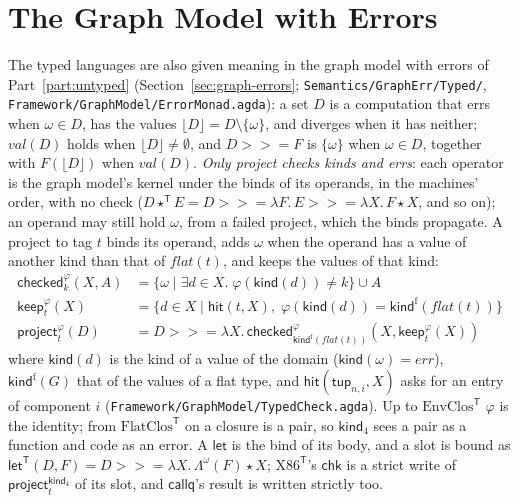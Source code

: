 \documentclass[10pt]{article}
\theoremstyle{acmplain}
\newcommand{\key}[1]{\mathsf{#1}}
\newcommand{\app}{\star}
\newcommand{\NE}{\neq\emptyset}
\newcommand{\bind}{\mathbin{>\!\!>\!\!=}}
\newcommand{\Tl}[1]{\textrm{#1}^{\mathsf{T}}}  %
\newcommand{\Tttup}[2]{\key{tup}_{#1,#2}}      %
\newcommand{\Tflatof}[1]{\mathit{flat}(#1)}    %
\newcommand{\Tchecked}[1]{\key{checked}^{#1}}             %
\newcommand{\Tkind}{\key{kind}}
\newcommand{\Tkindf}{\key{kind}^{\mathrm{f}}}             %
\newcommand{\Tkindfour}{\key{kind}_4}
\newcommand{\Tkeep}[1]{\key{keep}^{#1}}
\newcommand{\Thit}{\key{hit}}
\newcommand{\Tletv}{\key{let}^{\mathsf{T}}}               %
\begin{document}
\section{The Graph Model with Errors}\label{sec:t-gerr}

The typed languages are also given meaning in the graph model with errors
of Part~\ref{part:untyped} (Section~\ref{sec:graph-errors};
\texttt{Semantics/GraphErr/Typed/}, \texttt{Framework/GraphModel/ErrorMonad.agda}):
a set $D$ is a computation that errs when $\omega \in D$, has the values
$\lfloor D \rfloor = D \setminus \{\omega\}$, and diverges when it has
neither; $\mathit{val}(D)$ holds when $\lfloor D \rfloor \NE$, and $D \bind F$
is $\{\omega\}$ when $\omega \in D$, together with $F(\lfloor D \rfloor)$ when
$\mathit{val}(D)$. \emph{Only project checks kinds and errs}: each operator
is the graph model's kernel under the binds of its operands, in the
machines' order, with no check ($D \app^{\mathsf{T}} E = D \bind \lambda F.\,
E \bind \lambda X.\, F \app X$, and so on); an operand may still hold
$\omega$, from a failed project, which the binds propagate. A project to tag
$t$ binds its operand, adds $\omega$ when the operand has a value of another
kind than that of $\Tflatof{t}$, and keeps the values of that kind:
\begin{align*}
  \Tchecked{\varphi}_k(X, A) &= \{ \omega \mid \exists d \in X.\; \varphi(\Tkind(d)) \neq k \} \cup A \\
  \Tkeep{\varphi}_t(X) &= \{ d \in X \mid \Thit(t, X),\; \varphi(\Tkind(d)) = \Tkindf(\Tflatof{t}) \} \\
  \key{project}^{\varphi}_t(D) &= D \bind \lambda X.\, \Tchecked{\varphi}_{\Tkindf(\Tflatof{t})}(X, \Tkeep{\varphi}_t(X))
\end{align*}
where $\Tkind(d)$ is the kind of a value of the domain ($\Tkind(\omega) =
\mathit{err}$), $\Tkindf(G)$ that of the values of a flat type, and
$\Thit(\Tttup{n}{i}, X)$ asks for an entry of component $i$
(\texttt{Framework/GraphModel/TypedCheck.agda}). Up to $\Tl{EnvClos}$ $\varphi$
is the identity; from $\Tl{FlatClos}$ on a closure is a pair, so $\Tkindfour$
sees a pair as a function and code as an error. A $\key{let}$ is the bind
of its body, and a slot is bound as $\Tletv(D, F) = D \bind \lambda X.\,
\Lambda^{\omega}(F) \app X$; $\Tl{X86}$'s $\key{chk}$ is a strict write of
$\key{project}^{\Tkindfour}_t$ of its slot, and $\key{callq}$'s result is
written strictly too.
\end{document}
